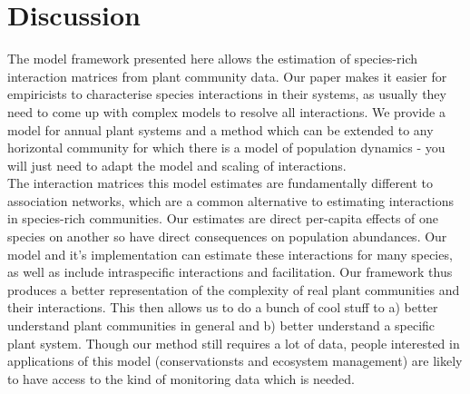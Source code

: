 \documentclass[a4,12pt]{article}
\begin{document}






\section{Discussion}

    
    The model framework presented here allows the estimation of species-rich interaction matrices from plant community data. Our paper makes it easier for empiricists to characterise species interactions in their systems, as usually they need to come up with complex models to resolve all interactions. We provide a model for annual plant systems and a method which can be extended to any horizontal community for which there is a model of population dynamics - you will just need to adapt the model and scaling of interactions.\\

    The interaction matrices this model estimates are fundamentally different to association networks, which are a common alternative to estimating interactions in species-rich communities. Our estimates are direct per-capita effects of one species on another so have direct consequences on population abundances. Our model and it's implementation can estimate these interactions for many species, as well as include intraspecific interactions and facilitation. Our framework thus produces a better representation of the complexity of real plant communities and their interactions. This then allows us to do a bunch of cool stuff to a) better understand plant communities in general and b) better understand a specific plant system. Though our method still requires a lot of data, people interested in applications of this model (conservationsts and ecosystem management) are likely to have access to the kind of monitoring data which is needed. 
\end{document}
